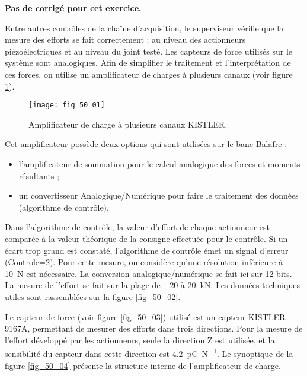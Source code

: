 \normaltrue \difficilefalse \tdifficilefalse
\correctionfalse

\setcounter{numques}{0}
\ifcorrection
\else
\textbf{Pas de corrigé pour cet exercice.}
\fi

\ifprof
\else


Entre autres contrôles de la chaîne d’acquisition, le superviseur vérifie que la mesure des
efforts se fait correctement : au niveau des actionneurs piézoélectriques et au niveau du
joint testé. Les capteurs de force utilisés sur le système sont analogiques. Afin de simplifier
le traitement et l’interprétation de ces forces, on utilise un amplificateur de charges à
plusieurs canaux (voir figure \ref{fig_50_01}).





\begin{figure}[H]
\centering
\texttt{[image: fig\_50\_01]}
\caption{Amplificateur de charge à plusieurs canaux KISTLER. \label{fig_50_01}}
\end{figure}



Cet amplificateur possède deux options qui sont utilisées sur le banc Balafre :
\begin{itemize}
\item l’amplificateur de sommation pour le calcul analogique des forces et moments résultants
;
\item un convertisseur Analogique/Numérique pour faire le traitement des données (algorithme
de contrôle).
\end{itemize}
Dans l’algorithme de contrôle, la valeur d’effort de chaque actionneur est comparée à
la valeur théorique de la consigne effectuée pour le contrôle. Si un écart trop grand est
constaté, l’algorithme de contrôle émet un signal d’erreur (Controle=2). Pour cette mesure,
on considère qu’une résolution inférieure à  \SI{10}{N} est nécessaire.
La conversion analogique/numérique se fait ici sur 12 bits. La mesure de l’effort se fait
sur la plage de $-20$ à \SI{20}{kN}. Les données techniques utiles sont rassemblées sur la figure
\ref{fig_50_02}.

Le capteur de force (voir figure \ref{fig_50_03}) utilisé est un capteur KISTLER 9167A, permettant
de mesurer des efforts dans trois directions. Pour la mesure de l’effort développé par
les actionneurs, seule la direction Z est utilisée, et la sensibilité du capteur dans cette
direction est \SI{4,2}{pC.N^{-1}}.
Le synoptique de la figure \ref{fig_50_04} présente la structure interne de l’amplificateur de charge.

